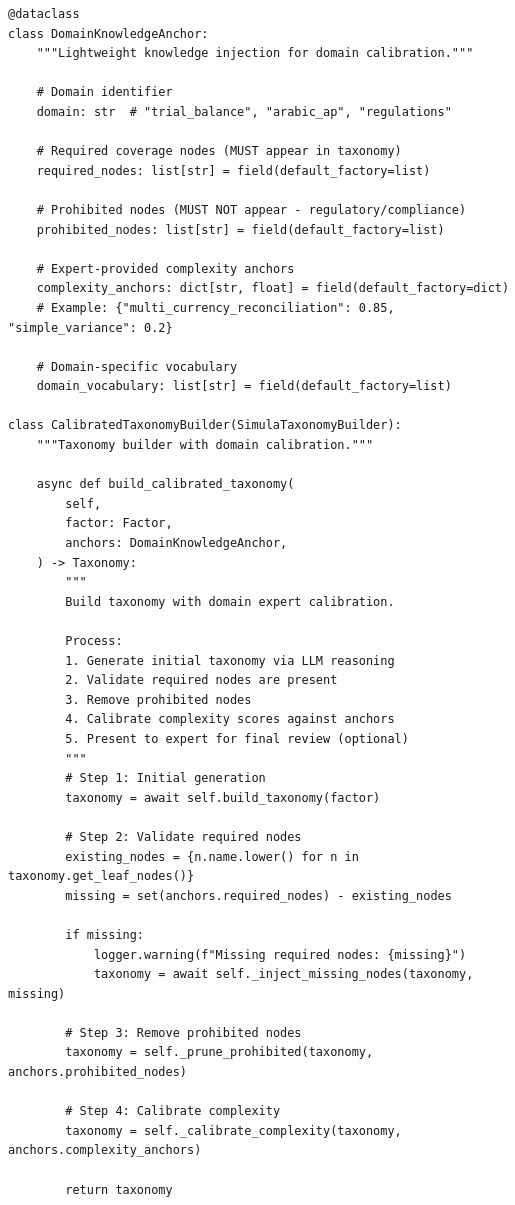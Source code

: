 \begin{lstlisting}[language=jsonx,caption={Domain knowledge anchor injection.}]
@dataclass
class DomainKnowledgeAnchor:
    """Lightweight knowledge injection for domain calibration."""
    
    # Domain identifier
    domain: str  # "trial_balance", "arabic_ap", "regulations"
    
    # Required coverage nodes (MUST appear in taxonomy)
    required_nodes: list[str] = field(default_factory=list)
    
    # Prohibited nodes (MUST NOT appear - regulatory/compliance)
    prohibited_nodes: list[str] = field(default_factory=list)
    
    # Expert-provided complexity anchors
    complexity_anchors: dict[str, float] = field(default_factory=dict)
    # Example: {"multi_currency_reconciliation": 0.85, "simple_variance": 0.2}
    
    # Domain-specific vocabulary
    domain_vocabulary: list[str] = field(default_factory=list)

class CalibratedTaxonomyBuilder(SimulaTaxonomyBuilder):
    """Taxonomy builder with domain calibration."""
    
    async def build_calibrated_taxonomy(
        self,
        factor: Factor,
        anchors: DomainKnowledgeAnchor,
    ) -> Taxonomy:
        """
        Build taxonomy with domain expert calibration.
        
        Process:
        1. Generate initial taxonomy via LLM reasoning
        2. Validate required nodes are present
        3. Remove prohibited nodes
        4. Calibrate complexity scores against anchors
        5. Present to expert for final review (optional)
        """
        # Step 1: Initial generation
        taxonomy = await self.build_taxonomy(factor)
        
        # Step 2: Validate required nodes
        existing_nodes = {n.name.lower() for n in taxonomy.get_leaf_nodes()}
        missing = set(anchors.required_nodes) - existing_nodes
        
        if missing:
            logger.warning(f"Missing required nodes: {missing}")
            taxonomy = await self._inject_missing_nodes(taxonomy, missing)
        
        # Step 3: Remove prohibited nodes
        taxonomy = self._prune_prohibited(taxonomy, anchors.prohibited_nodes)
        
        # Step 4: Calibrate complexity
        taxonomy = self._calibrate_complexity(taxonomy, anchors.complexity_anchors)
        
        return taxonomy
\end{lstlisting}

